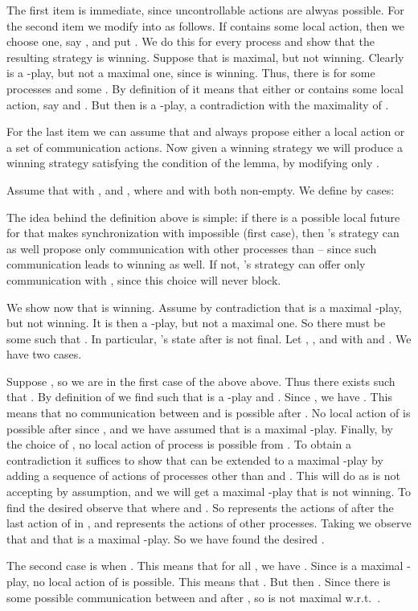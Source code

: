 \documentclass{llncs}
\renewenvironment{proof}{{\em Proof. }}{\nopagebreak
  \hspace*{\fill}}
\begin{document}
\begin{proof}
  The first item is immediate, since uncontrollable actions are alwyas
  possible. For the second item we modify  into  as
  follows. If  contains some local action, then we choose
  one, say , and put . We do this for every
  process  and show that the resulting strategy  is
  winning. Suppose that  is maximal, but not
  winning. Clearly  is a -play, but not a maximal one, since
   is winning.  Thus, there is  for some
  processes  and some . By definition of
   it means that either  or
   contains some local action, say  and . But then  is
  a -play, a contradiction with the maximality of .

For the last item we can assume that  and  always
  propose either a local action or a set of communication actions. Now
  given a winning strategy  we will produce a winning strategy
   satisfying the condition of the lemma, by modifying only .

 Assume that  with , and
 , where  and 
 with both   non-empty.
 We define  by cases:
 
The idea behind the definition above is simple: if there is a possible
local future for  that makes synchronization with  impossible (first
case), then 's strategy can as well propose only communication with
other processes than  -- since such communication leads to winning
as well. If not, 's strategy can  offer only communication with ,
since this choice will never block.

We show now that  is winning.  Assume by contradiction that 
is a maximal -play, but not winning.  It is then a -play, but
not a maximal one. So there must be some  such that
.  In particular, 's state after  is not
final.  Let , , and 
with  and . We
have two cases.

Suppose , so we are in the first case of the above
above. Thus there exists  such that . By definition of  we find
 such that  is a -play and
. Since , we have
. This means that no communication between
 and  is possible after . No local action of  is possible
after  since , and we have assumed that  is a
maximal -play. Finally, by the choice of , no local action of
process  is possible from . To obtain a contradiction it
suffices to show that  can be extended to a maximal -play by
adding a sequence of actions  of processes other than  and
. This will do as  is not accepting by assumption,
and we will get a maximal -play that is not winning.  To find the
desired  observe that  where
 and . So 
represents the actions of  after the last action of   in ,
and  represents the actions of other processes.  Taking  we
observe that  and 
that  is a maximal -play. So we have found the desired .



The second case is when . This means that for all 
, we have 
. Since  is a maximal -play,
 no local action of  is possible. This means that
 . But then
 . Since  there is
 some  possible communication between
  and  after , so  is not maximal
 w.r.t.~.
\end{proof}
\end{document}
